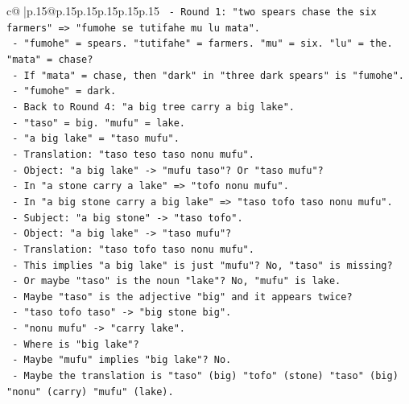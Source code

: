 \documentclass{article}
\begin{document}
{\begin{supertabular}{c@{$\;$}|p{.15\linewidth}@{}p{.15\linewidth}p{.15\linewidth}p{.15\linewidth}p{.15\linewidth}p{.15\linewidth}}
{{{\texttt{                {-} Round 1: "two spears chase the six farmers" => "fumohe se tutifahe mu lu mata".} \\
\texttt{                  {-} "fumohe" = spears. "tutifahe" = farmers. "mu" = six. "lu" = the. "mata" = chase?} \\
\texttt{                  {-} If "mata" = chase, then "dark" in "three dark spears" is "fumohe".} \\
\texttt{                  {-} "fumohe" = dark.} \\
\texttt{                {-} Back to Round 4: "a big tree carry a big lake".} \\
\texttt{                  {-} "taso" = big. "mufu" = lake.} \\
\texttt{                  {-} "a big lake" = "taso mufu".} \\
\texttt{                  {-} Translation: "taso teso taso nonu mufu".} \\
\texttt{                  {-} Object: "a big lake" {-}> "mufu taso"? Or "taso mufu"?} \\
\texttt{                  {-} In "a stone carry a lake" => "tofo nonu mufu".} \\
\texttt{                  {-} In "a big stone carry a big lake" => "taso tofo taso nonu mufu".} \\
\texttt{                    {-} Subject: "a big stone" {-}> "taso tofo".} \\
\texttt{                    {-} Object: "a big lake" {-}> "taso mufu"?} \\
\texttt{                    {-} Translation: "taso tofo taso nonu mufu".} \\
\texttt{                    {-} This implies "a big lake" is just "mufu"? No, "taso" is missing?} \\
\texttt{                    {-} Or maybe "taso" is the noun "lake"? No, "mufu" is lake.} \\
\texttt{                    {-} Maybe "taso" is the adjective "big" and it appears twice?} \\
\texttt{                    {-} "taso tofo taso" {-}> "big stone big".} \\
\texttt{                    {-} "nonu mufu" {-}> "carry lake".} \\
\texttt{                    {-} Where is "big lake"?} \\
\texttt{                    {-} Maybe "mufu" implies "big lake"? No.} \\
\texttt{                    {-} Maybe the translation is "taso" (big) "tofo" (stone) "taso" (big) "nonu" (carry) "mufu" (lake).} \\
}}}
\end{supertabular}}
\end{document}
